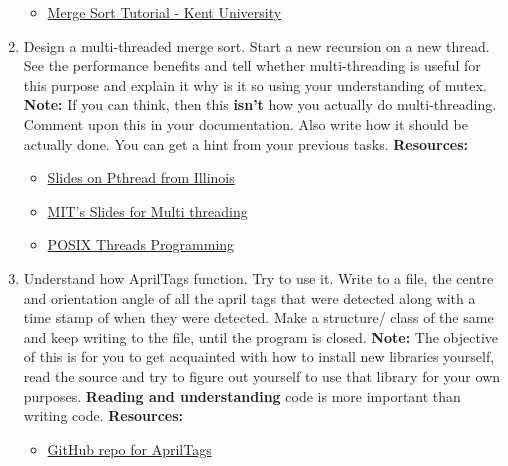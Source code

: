 \documentclass{article}
\begin{document}
\begin{enumerate}
    \begin{itemize}
        \item \href{http://www.personal.kent.edu/~rmuhamma/Algorithms/MyAlgorithms/Sorting/mergeSort.htm}{Merge Sort Tutorial - Kent University}

    \end{itemize}

\item Design a multi-threaded merge sort. Start a new recursion on a new thread. See the performance benefits and tell whether multi-threading is useful for this purpose and explain it why is it so using your understanding of mutex.
{\newline}{\newline}
{\bf Note:} If you can think, then this {\bf isn't} how you actually do multi-threading. Comment upon this in your documentation. Also write how it should be actually done. You can get a hint from your previous tasks.
{\newline}{\newline}
{\bf Resources:}

    \begin{itemize}
        \item \href{https://courses.engr.illinois.edu/cs241/fa2010/ppt/10-pthread-examples.pdf}{Slides on Pthread from Illinois}
        \item \href{https://ocw.mit.edu/courses/electrical-engineering-and-computer-science/6-087-practical-programming-in-c-january-iap-2010/lecture-notes/MIT6_087IAP10_lec12.pdf}{MIT's Slides for Multi threading}
        \item \href{https://computing.llnl.gov/tutorials/pthreads/}{POSIX Threads Programming}
    \end{itemize}

\item Understand how AprilTags function. Try to use it. Write to a file, the centre and orientation angle of all the april tags that were detected along with a time stamp of when they were detected. Make a structure/ class of the same and keep writing to the file, until the program is closed.
{\newline}{\newline}
{\bf Note:} The objective of this is for you to get acquainted with how to install new libraries yourself, read the source and try to figure out yourself to  use that library for your own purposes. {\bf Reading and understanding} code is more important than writing code.
{\newline}{\newline}
{\bf Resources:}
    \begin{itemize}
        \item \href{https://github.com/swatbotics/apriltags-cpp}{GitHub repo for AprilTags}
    \end{itemize}

\end{enumerate}%
\end{document}
